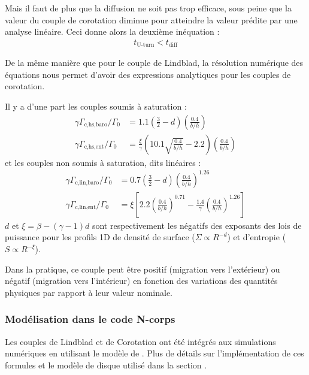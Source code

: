 Mais il faut de plus que la diffusion ne soit pas trop efficace, sous peine que la valeur du couple de corotation diminue pour atteindre la valeur prédite par une analyse linéaire. Ceci donne alors la deuxième inéquation : 
\begin{align}
t_\text{U-turn} < t_\text{diff}
\end{align}

\bigskip

De la même manière que pour le couple de Lindblad, la résolution numérique des équations nous permet d'avoir des expressions analytiques pour les couples de corotation. 

Il y a d'une part les couples soumis à saturation \citep[eq. (45)]{paardekooper2010torque} :
\begin{subequations}
\begin{align}
\gamma \Gamma_\text{c,hs,baro}/\Gamma_0 &= 1.1\left( \frac{3}{2} - d\right)\left(\frac{0.4}{b/h}\right)\\
\gamma \Gamma_\text{c,hs,ent}/\Gamma_0 &= \frac{\xi}{\gamma}\left(10.1\sqrt{\frac{0.4}{b/h}} - 2.2\right)\left(\frac{0.4}{b/h}\right)
\end{align}\label{eq:saturated-corotation-torque}
\end{subequations}
et les couples non soumis à saturation, dits linéaires \citep[eq. (17)]{paardekooper2010torque} :
\begin{subequations}
\begin{align}
\gamma \Gamma_\text{c,lin,baro}/\Gamma_0 &= 0.7\left( \frac{3}{2} - d\right)\left(\frac{0.4}{b/h}\right)^{1.26}\\
\gamma \Gamma_\text{c,lin,ent}/\Gamma_0 &= \xi\left[2.2\left(\frac{0.4}{b/h}\right)^{0.71} - \frac{1.4}{\gamma}\left(\frac{0.4}{b/h}\right)^{1.26}\right]
\end{align}\label{eq:linear-corotation-torque}
\end{subequations}
$d$ et $\xi=\beta - (\gamma-1)d$ sont respectivement les négatifs des exposants des lois de puissance pour les profils 1D de densité de surface ($\Sigma\propto R^{-d}$) et d'entropie ($S \propto R^{-\xi}$).

\bigskip

Dans la pratique, ce couple peut être positif (migration vers l'extérieur) ou négatif (migration vers l'intérieur) en fonction
des variations des quantités physiques par rapport à leur valeur nominale.

\subsubsection{Modélisation dans le code N-corps}
Les couples de Lindblad et de Corotation ont été intégrés aux simulations numériques en utilisant le modèle de \cite{paardekooper2011torque}. Plus de détails sur l'implémentation de ces formules et le modèle de disque utilisé dans la section .

